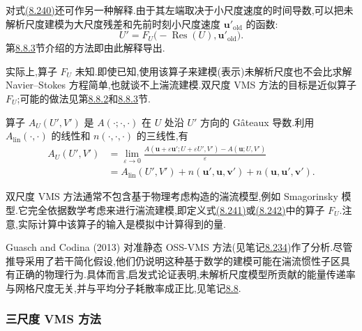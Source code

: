 \begin{note}
对式\hyperref[eq:vms-two-scale-unresolved-equation]{(8.240)}还可作另一种解释.由于其左端取决于小尺度速度的时间导数,可以把未解析尺度建模为大尺度残差和先前时刻小尺度速度 $\bm{u}'_{\mathrm{old}}$ 的函数:
\begin{equation}\label{eq:vms-two-scale-unresolved-history-operator}
 U'=F_U\bigl(-\operatorname{Res}(U),\bm{u}'_{\mathrm{old}}\bigr).
\end{equation}
第\hyperref[subsec:vms-time-dependent-method]{8.8.3}节介绍的方法即由此解释导出.

实际上,算子 $F_U$ 未知.即使已知,使用该算子来建模(表示)未解析尺度也不会比求解 Navier--Stokes 方程简单,也就谈不上湍流建模.双尺度 VMS 方法的目标是近似算子 $F_U$;可能的做法见第\hyperref[subsec:vms-residual-based-method]{8.8.2}和\hyperref[subsec:vms-time-dependent-method]{8.8.3}节.
\end{note}

\begin{note}[算子 $A_U(U',V')$]
\label{note:vms-gateaux-derivative}
算子 $A_U(U',V')$ 是 $A(\cdot;\cdot,\cdot)$ 在 $U$ 处沿 $U'$ 方向的 Gâteaux 导数.利用 $A_{\mathrm{lin}}(\cdot,\cdot)$ 的线性和 $n(\cdot,\cdot,\cdot)$ 的三线性,有
\[
\begin{aligned}
 A_U(U',V')
 &=\lim_{\varepsilon\to0}
  \frac{A(\bm{u}+\varepsilon\bm{u}';
             U+\varepsilon U',V')-A(\bm{u};U,V')}{\varepsilon}\\
 &=A_{\mathrm{lin}}(U',V')
   +n(\bm{u}',\bm{u},\bm{v}')
   +n(\bm{u},\bm{u}',\bm{v}').
\end{aligned}
\]
\end{note}

\begin{note}[不依赖物理湍流模型的湍流建模]
\label{note:vms-without-physical-model}
双尺度 VMS 方法通常不包含基于物理考虑构造的湍流模型,例如 Smagorinsky 模型.它完全依据数学考虑来进行湍流建模,即定义式\hyperref[eq:vms-two-scale-unresolved-operator]{(8.241)}或\hyperref[eq:vms-two-scale-unresolved-history-operator]{(8.242)}中的算子 $F_U$.注意,实际计算中该算子的输入是模拟中计算得到的量.

Guasch and Codina (2013) 对准静态 OSS-VMS 方法(见笔记\hyperref[note:vms-oss-method]{8.234})作了分析.尽管推导采用了若干简化假设,他们仍说明这种基于数学的建模可能在湍流惯性子区具有正确的物理行为.具体而言,启发式论证表明,未解析尺度模型所贡献的能量传递率与网格尺度无关,并与平均分子耗散率成正比,见笔记\hyperref[note:turbulent-energy-dissipation-rate]{8.8}.
\end{note}

\subsubsection{三尺度 VMS 方法}\label{subsubsec:vms-three-scale}

